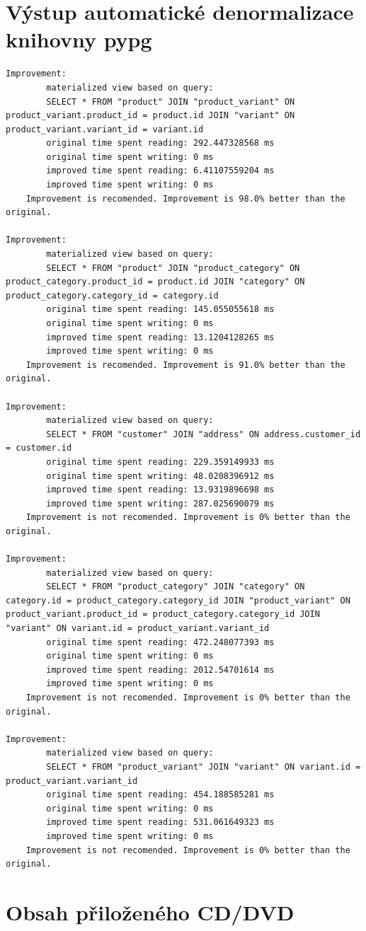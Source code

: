 \documentclass[ing,male,java,dept456]{diploma}						%
\begin{document}
\section{Výstup automatické denormalizace knihovny pypg}
\label{sec:Appendixdenom}
\begin{lstlisting}[label=src:pypg-denomoutup, caption=Výstup automatické denormalizace po testech popsaných v kapitole \ref{sec:Bench}]
Improvement: 
        materialized view based on query: 
		SELECT * FROM "product" JOIN "product_variant" ON product_variant.product_id = product.id JOIN "variant" ON product_variant.variant_id = variant.id 
        original time spent reading: 292.447328568 ms
        original time spent writing: 0 ms
        improved time spent reading: 6.41107559204 ms 
        improved time spent writing: 0 ms
	Improvement is recomended. Improvement is 98.0% better than the original.
	
Improvement: 
        materialized view based on query: 
		SELECT * FROM "product" JOIN "product_category" ON product_category.product_id = product.id JOIN "category" ON product_category.category_id = category.id 
        original time spent reading: 145.055055618 ms
        original time spent writing: 0 ms
        improved time spent reading: 13.1204128265 ms 
        improved time spent writing: 0 ms
	Improvement is recomended. Improvement is 91.0% better than the original.
	
Improvement: 
        materialized view based on query: 
		SELECT * FROM "customer" JOIN "address" ON address.customer_id = customer.id 
        original time spent reading: 229.359149933 ms
        original time spent writing: 48.0208396912 ms
        improved time spent reading: 13.9319896698 ms 
        improved time spent writing: 287.025690079 ms
	Improvement is not recomended. Improvement is 0% better than the original.
	
Improvement: 
        materialized view based on query: 
		SELECT * FROM "product_category" JOIN "category" ON category.id = product_category.category_id JOIN "product_variant" ON product_variant.product_id = product_category.category_id JOIN "variant" ON variant.id = product_variant.variant_id 
        original time spent reading: 472.248077393 ms
        original time spent writing: 0 ms
        improved time spent reading: 2012.54701614 ms 
        improved time spent writing: 0 ms
	Improvement is not recomended. Improvement is 0% better than the original.
	
Improvement: 
        materialized view based on query: 
		SELECT * FROM "product_variant" JOIN "variant" ON variant.id = product_variant.variant_id 
        original time spent reading: 454.188585281 ms
        original time spent writing: 0 ms
        improved time spent reading: 531.061649323 ms 
        improved time spent writing: 0 ms
	Improvement is not recomended. Improvement is 0% better than the original.
\end{lstlisting}
\section{Obsah přiloženého CD/DVD}
\label{sec:Appendixcd}
\end{document}
